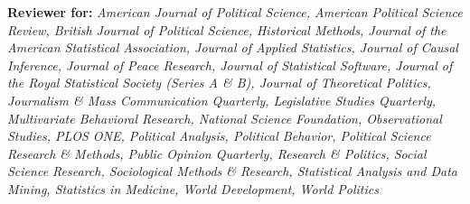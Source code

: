 \documentclass[margin,line,12pt]{res}
\begin{document}
\begin{resume}
\textbf{Reviewer for:} \emph{American Journal of Political Science, American Political Science Review,  British Journal of Political Science, Historical Methods, Journal of the American Statistical Association, Journal of Applied Statistics, Journal of Causal Inference, Journal of Peace Research, Journal of Statistical Software, Journal of the Royal Statistical Society (Series A \& B), Journal of Theoretical Politics, Journalism \& Mass Communication Quarterly, Legislative Studies Quarterly, Multivariate Behavioral Research, National Science Foundation, Observational Studies, PLOS ONE, Political Analysis, Political Behavior, Political Science Research \& Methods, Public Opinion Quarterly, Research \& Politics, Social Science Research, Sociological Methods \& Research,  Statistical Analysis and Data Mining, Statistics in Medicine, World Development, World Politics}




\end{resume}
\end{document}
